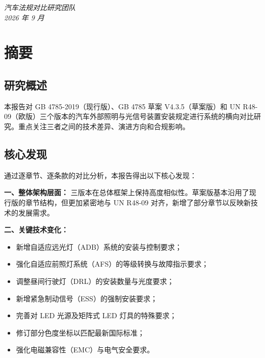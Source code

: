 \vspace{1cm}
\begin{flushright}
\begin{minipage}{0.4\textwidth}
\textit{汽车法规对比研究团队}\\
\textit{2026 年 9 月}
\end{minipage}
\end{flushright}

\clearpage


\chapter*{摘要}

\section*{研究概述}

本报告对 GB 4785-2019（现行版）、GB 4785 草案 V4.3.5（草案版）和 UN R48-09（欧版）三个版本的汽车外部照明与光信号装置安装规定进行系统的横向对比研究。重点关注三者之间的技术差异、演进方向和合规影响。

\section*{核心发现}

通过逐章节、逐条款的对比分析，本报告得出以下核心发现：

\textbf{一、整体架构层面：} 三版本在总体框架上保持高度相似性。草案版基本沿用了现行版的章节结构，但更加紧密地与 UN R48-09 对齐，新增了部分章节以反映新技术的发展需求。

\textbf{二、关键技术变化：}
\begin{itemize}[leftmargin=2em]
    \item 新增自适应远光灯（ADB）系统的安装与控制要求；
    \item 强化自适应前照灯系统（AFS）的等级转换与故障指示要求；
    \item 调整昼间行驶灯（DRL）的安装数量与光度要求；
    \item 新增紧急制动信号（ESS）的强制安装要求；
    \item 完善对 LED 光源及矩阵式 LED 灯具的特殊要求；
    \item 修订部分色度坐标以匹配最新国际标准；
    \item 强化电磁兼容性（EMC）与电气安全要求。
\end{itemize}

